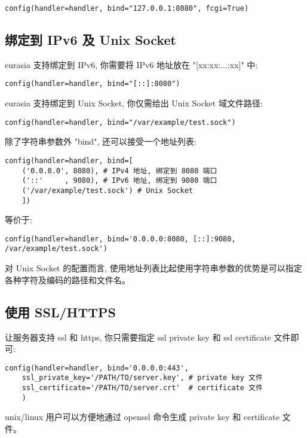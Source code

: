 \documentclass{manual}
\begin{document}
\begin{verbatim}
config(handler=handler, bind="127.0.0.1:8080", fcgi=True)
\end{verbatim}

\subsection{绑定到 IPv6 及 Unix Socket}

eurasia 支持绑定到 IPv6, 你需要将 IPv6 地址放在 "[xx:xx:...:xx]" 中:

\begin{verbatim}
config(handler=handler, bind="[::]:8080")
\end{verbatim}

eurasia 支持绑定到 Unix Socket, 你仅需给出 Unix Socket 域文件路径:

\begin{verbatim}
config(handler=handler, bind="/var/example/test.sock")
\end{verbatim}

除了字符串参数外 "bind", 还可以接受一个地址列表:

\begin{verbatim}
config(handler=handler, bind=[
	('0.0.0.0', 8080), # IPv4 地址, 绑定到 8080 端口
	('::'     , 9080), # IPv6 地址, 绑定到 9080 端口
	('/var/example/test.sock') # Unix Socket
	])
\end{verbatim}

等价于:

\begin{verbatim}
config(handler=handler, bind='0.0.0.0:8080, [::]:9080, /var/example/test.sock')
\end{verbatim}

对 Unix Socket 的配置而言,
使用地址列表比起使用字符串参数的优势是可以指定各种字符及编码的路径和文件名。

\subsection{使用 SSL/HTTPS}

让服务器支持 ssl 和 https, 你只需要指定 ssl private key 和 ssl certificate 文件即可:

\begin{verbatim}
config(handler=handler, bind='0.0.0.0:443',
	ssl_private_key='/PATH/TO/server.key', # private key 文件
	ssl_certificate='/PATH/TO/server.crt'  # certificate 文件
	)
\end{verbatim}

unix/linux 用户可以方便地通过 openssl 命令生成 private key 和 certificate 文件。
\end{document}
